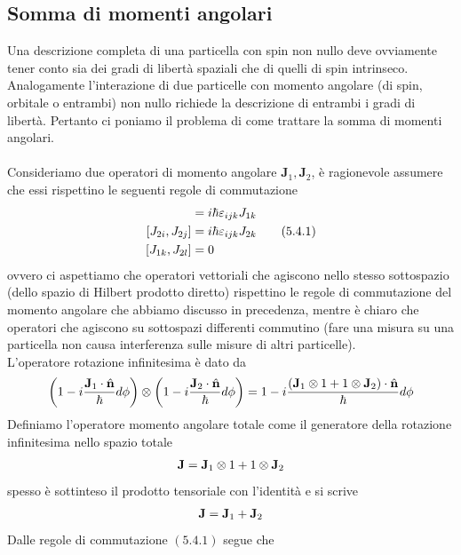 \documentclass{article}
\begin{document}
\subsection{Somma di momenti angolari}
Una descrizione completa di una particella con spin non nullo deve ovviamente tener conto sia dei gradi di libertà spaziali che di quelli di spin intrinseco. Analogamente l'interazione di due particelle con momento angolare (di spin, orbitale o entrambi) non nullo richiede la descrizione di entrambi i gradi di libertà. Pertanto ci poniamo il problema di come trattare la somma di momenti angolari. \\ \\
Consideriamo due operatori di momento angolare $\mathbf{J}_1, \mathbf{J}_2$, è ragionevole assumere che essi rispettino le seguenti regole di commutazione
\begin{align}
    [J_{1i}, J_{ij}] &= i\hbar\varepsilon_{ijk}J_{1k} \notag \\
    [J_{2i}, J_{2j}] &= i\hbar\varepsilon_{ijk}J_{2k} \tag{5.4.1} \\
    [J_{1k}, J_{2l}] &= 0 \notag
\end{align}
ovvero ci aspettiamo che operatori vettoriali che agiscono nello stesso sottospazio (dello spazio di Hilbert prodotto diretto) rispettino le regole di commutazione del momento angolare che abbiamo discusso in precedenza, mentre è chiaro che operatori che agiscono su sottospazi differenti commutino (fare una misura su una particella non causa interferenza sulle misure di altri particelle). \\
L'operatore rotazione infinitesima è dato da
\begin{gather}
    \left( 1 - i\frac{\mathbf{J}_1 \cdot \hat{\mathbf{n}}}{\hbar}d\phi \right) \otimes \left( 1 - i\frac{\mathbf{J}_2 \cdot \hat{\mathbf{n}}}{\hbar}d\phi \right) = 1 - i\frac{(\mathbf{J}_1 \otimes 1 + 1 \otimes \mathbf{J}_2) \cdot \hat{\mathbf{n}}}{\hbar}d\phi \notag
\end{gather}
Definiamo l'operatore momento angolare totale come il generatore della rotazione infinitesima nello spazio totale
\begin{gather}
    \mathbf{J} = \mathbf{J}_1 \otimes 1 + 1 \otimes \mathbf{J}_2 \notag
\end{gather}
spesso è sottinteso il prodotto tensoriale con l'identità e si scrive
\begin{gather}
    \mathbf{J} = \mathbf{J}_1 + \mathbf{J}_2 \notag
\end{gather}
Dalle regole di commutazione $(5.4.1)$ segue che
\end{document}

